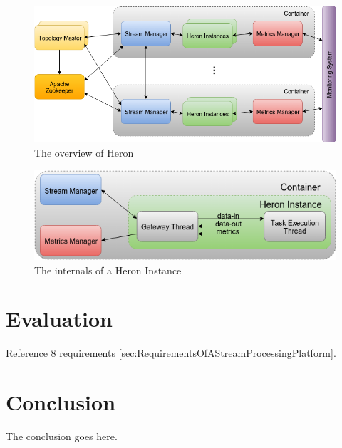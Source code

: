 \documentclass[conference]{IEEEtran}
\begin{document}
\begin{figure}[!tp]
    \centering
    \includegraphics[scale=0.45]{figures/HeronOverview}
    \caption{The overview of Heron}
    \label{fig:HeronOverview}
\end{figure}

\begin{figure}[htp]
    \centering
    \includegraphics[scale=0.45]{figures/HeronInstance}
    \caption{The internals of a Heron Instance}
    \label{fig:HeronInstance}
\end{figure}

\cite{ElasticScalingStreamProcessing}
\cite{OnlyOneLook}
\cite{YARN}
\cite{ScalableDistributedStreamProcessing}



\section{Evaluation}
\label{sec:Evaluation}


\cite{TwitterHeronBlog}

\cite{TwitterHeron}

Reference 8 requirements \ref{sec:RequirementsOfAStreamProcessingPlatform}.


\section{Conclusion}
\label{sec:Conclusion}

The conclusion goes here.




\end{document}

